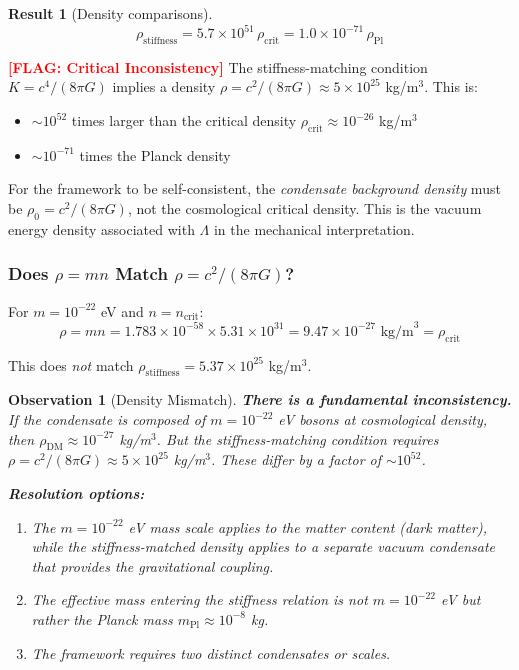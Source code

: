 \documentclass[11pt,a4paper]{article}
\newcommand{\ee}[1]{\times 10^{#1}}
\newcommand{\mPl}{\ensuremath{m_{\mathrm{Pl}}}}
\newcommand{\rhocrit}{\ensuremath{\rho_{\mathrm{crit}}}}
\newcommand{\FLAG}[1]{\textcolor{red}{\textbf{[FLAG: #1]}}}
\newtheorem{result}{Result}
\newtheorem{observation}{Observation}
\begin{document}
\begin{result}[Density comparisons]
\begin{equation}
\boxed{\rho_{\mathrm{stiffness}} = 5.7 \times 10^{51} \, \rhocrit = 1.0 \times 10^{-71} \, \rho_{\mathrm{Pl}}}
\end{equation}
\end{result}

\FLAG{Critical Inconsistency} The stiffness-matching condition $K = c^4/(8\pi G)$ implies a density $\rho = c^2/(8\pi G) \approx 5 \ee{25}$ kg/m$^3$. This is:
\begin{itemize}
    \item $\sim 10^{52}$ times larger than the critical density $\rhocrit \approx 10^{-26}$ kg/m$^3$
    \item $\sim 10^{-71}$ times the Planck density
\end{itemize}

For the framework to be self-consistent, the \emph{condensate background density} must be $\rho_0 = c^2/(8\pi G)$, not the cosmological critical density. This is the vacuum energy density associated with $\Lambda$ in the mechanical interpretation.

\subsubsection{Does $\rho = mn$ Match $\rho = c^2/(8\pi G)$?}

For $m = 10^{-22}$ eV and $n = n_{\mathrm{crit}}$:
\begin{equation}
\rho = mn = 1.783 \ee{-58} \times 5.31 \ee{31} = 9.47 \ee{-27} \text{ kg/m}^3 = \rhocrit
\end{equation}

This does \emph{not} match $\rho_{\mathrm{stiffness}} = 5.37 \ee{25}$ kg/m$^3$.

\begin{observation}[Density Mismatch]
\textbf{There is a fundamental inconsistency.} If the condensate is composed of $m = 10^{-22}$ eV bosons at cosmological density, then $\rho_{\mathrm{DM}} \approx 10^{-27}$ kg/m$^3$. But the stiffness-matching condition requires $\rho = c^2/(8\pi G) \approx 5 \ee{25}$ kg/m$^3$. These differ by a factor of $\sim 10^{52}$.

\textbf{Resolution options:}
\begin{enumerate}
    \item The $m = 10^{-22}$ eV mass scale applies to the \emph{matter content} (dark matter), while the stiffness-matched density applies to a separate \emph{vacuum condensate} that provides the gravitational coupling.
    \item The effective mass entering the stiffness relation is not $m = 10^{-22}$ eV but rather the Planck mass $\mPl \approx 10^{-8}$ kg.
    \item The framework requires two distinct condensates or scales.
\end{enumerate}
\end{observation}
\end{document}
